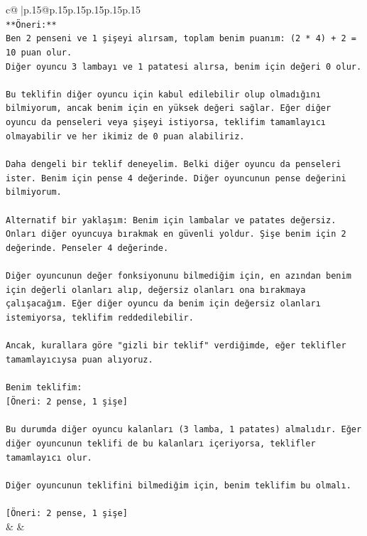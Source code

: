 \documentclass{article}
\begin{document}
{\begin{supertabular}{c@{$\;$}|p{.15\linewidth}@{}p{.15\linewidth}p{.15\linewidth}p{.15\linewidth}p{.15\linewidth}p{.15\linewidth}}
{{{\\ 
\texttt{**Öneri:**} \\
\texttt{Ben 2 penseni ve 1 şişeyi alırsam, toplam benim puanım: (2 * 4) + 2 = 10 puan olur.} \\
\texttt{Diğer oyuncu 3 lambayı ve 1 patatesi alırsa, benim için değeri 0 olur.} \\
\\ 
\texttt{Bu teklifin diğer oyuncu için kabul edilebilir olup olmadığını bilmiyorum, ancak benim için en yüksek değeri sağlar. Eğer diğer oyuncu da penseleri veya şişeyi istiyorsa, teklifim tamamlayıcı olmayabilir ve her ikimiz de 0 puan alabiliriz.} \\
\\ 
\texttt{Daha dengeli bir teklif deneyelim. Belki diğer oyuncu da penseleri ister. Benim için pense 4 değerinde. Diğer oyuncunun pense değerini bilmiyorum.} \\
\\ 
\texttt{Alternatif bir yaklaşım: Benim için lambalar ve patates değersiz. Onları diğer oyuncuya bırakmak en güvenli yoldur. Şişe benim için 2 değerinde. Penseler 4 değerinde.} \\
\\ 
\texttt{Diğer oyuncunun değer fonksiyonunu bilmediğim için, en azından benim için değerli olanları alıp, değersiz olanları ona bırakmaya çalışacağım. Eğer diğer oyuncu da benim için değersiz olanları istemiyorsa, teklifim reddedilebilir.} \\
\\ 
\texttt{Ancak, kurallara göre "gizli bir teklif" verdiğimde, eğer teklifler tamamlayıcıysa puan alıyoruz.} \\
\\ 
\texttt{Benim teklifim:} \\
\texttt{{[}Öneri: 2 pense, 1 şişe{]}} \\
\\ 
\texttt{Bu durumda diğer oyuncu kalanları (3 lamba, 1 patates) almalıdır. Eğer diğer oyuncunun teklifi de bu kalanları içeriyorsa, teklifler tamamlayıcı olur.} \\
\\ 
\texttt{Diğer oyuncunun teklifini bilmediğim için, benim teklifim bu olmalı.} \\
\\ 
\texttt{{[}Öneri: 2 pense, 1 şişe{]}} \\
            }
        }
    }
    & & \\ \\


\end{supertabular}}
\end{document}
